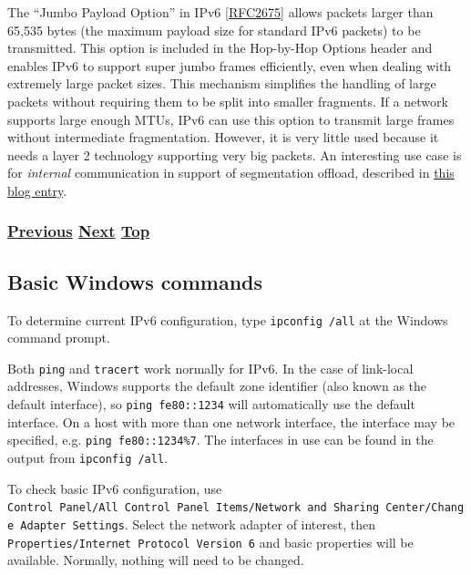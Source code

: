 \documentclass[
]{article}
\begin{document}
The ``Jumbo Payload Option'' in IPv6
{[}\href{https://www.rfc-editor.org/info/rfc2675}{RFC2675}{]} allows
packets larger than 65,535 bytes (the maximum payload size for standard
IPv6 packets) to be transmitted. This option is included in the
Hop-by-Hop Options header and enables IPv6 to support super jumbo frames
efficiently, even when dealing with extremely large packet sizes. This
mechanism simplifies the handling of large packets without requiring
them to be split into smaller fragments. If a network supports large
enough MTUs, IPv6 can use this option to transmit large frames without
intermediate fragmentation. However, it is very little used because it
needs a layer 2 technology supporting very big packets. An interesting
use case is for \emph{internal} communication in support of segmentation
offload, described in
\href{https://www.sipanda.io/post/segmentation-offload-and-protocols-let-s-be-friends}{this
blog entry}.

\subsubsection{\texorpdfstring{\hyperref[energy-consumption]{Previous}
\hyperref[basic-windows-commands]{Next}
\hyperref[management-and-operations]{Top}}{Previous Next Top}}\label{previous-next-top-34}

\pagebreak

\subsection{Basic Windows commands}\label{basic-windows-commands}

To determine current IPv6 configuration, type \texttt{ipconfig\ /all} at
the Windows command prompt.

Both \texttt{ping} and \texttt{tracert} work normally for IPv6. In the
case of link-local addresses, Windows supports the default zone
identifier (also known as the default interface), so
\texttt{ping\ fe80::1234} will automatically use the default interface.
On a host with more than one network interface, the interface may be
specified, e.g. \texttt{ping\ fe80::1234\%7}. The interfaces in use can
be found in the output from \texttt{ipconfig\ /all}.

To check basic IPv6 configuration, use
\texttt{Control\ Panel/All\ Control\ Panel\ Items/Network\ and\ Sharing\ Center/Change\ Adapter\ Settings}.
Select the network adapter of interest, then
\texttt{Properties/Internet\ Protocol\ Version\ 6} and basic properties
will be available. Normally, nothing will need to be changed.
\end{document}
